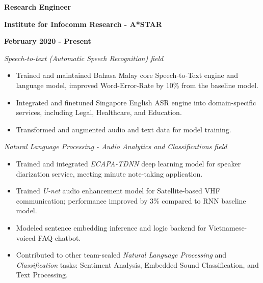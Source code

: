 \documentclass[10pt]{article}
\begin{document}
        \begin{multicols}{3}
            \begin{flushleft}
                \textbf{Research Engineer}
            \end{flushleft}

            \columnbreak

            \begin{center}
                \textbf{Institute for Infocomm Research - A*STAR}
            \end{center}

            \columnbreak

            \begin{flushright}
                \textbf{February 2020 - Present}
            \end{flushright}
        \end{multicols}

        \vspace{-5mm}
        \emph{Speech-to-text (Automatic Speech Recognition) field}
        \vspace{-2.5mm}
        \begin{itemize}[noitemsep]
            \item Trained and maintained Bahasa Malay core Speech-to-Text engine and language model, improved Word-Error-Rate by 10\% from the baseline model.
            \item Integrated and finetuned Singapore English ASR engine into domain-specific services, including Legal, Healthcare, and Education.
            \item Transformed and augmented audio and text data for model training.
        \end{itemize}

        \emph{Natural Language Processing - Audio Analytics and Classifications field}
        \vspace{-2.5mm}
        \begin{itemize}[noitemsep]
            \item Trained and integrated \emph{ECAPA-TDNN} deep learning model for speaker diarization service, meeting minute note-taking application.
            \item Trained \emph{U-net} audio enhancement model for Satellite-based VHF communication; performance improved by 3\% compared to RNN baseline model.
            \item Modeled sentence embedding inference and logic backend for Vietnamese-voiced FAQ chatbot.
            \item Contributed to other team-scaled \emph{Natural Language Processing} and \emph{Classification} tasks: Sentiment Analysis, Embedded Sound Classification, and Text Processing.
        \end{itemize}
\end{document}
